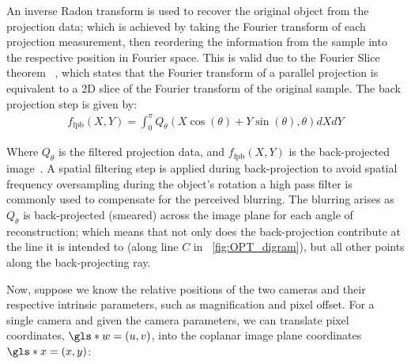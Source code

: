 \documentclass{osa-article}
\begin{document}

An inverse Radon transform is used to recover the original object from the projection data; which is achieved by taking the Fourier transform of each projection measurement, then reordering the information from the sample into the respective position in Fourier space.
This is valid due to the Fourier Slice theorem~\cite{bracewellStripIntegrationRadio1956}
, which states that the Fourier transform of a parallel projection is equivalent to a 2D slice of the Fourier transform of the original sample.
The back projection step is given by:
\begin{align}
  f_{\text{fpb}}(X,Y) = \int_{0}^{\pi} Q_\theta (X\cos(\theta)+Y\sin(\theta),\theta)dXdY
\end{align}

Where \(Q_\theta \) is the filtered projection data, and \(f_{\text{fpb}}(X,Y)\) is the back-projected image~\cite{dudgeonMultidimensionalDigitalSignal1984}.
A spatial filtering step is applied during back-projection  to avoid spatial frequency oversampling during the object’s rotation
a high pass filter is commonly used to compensate for the perceived blurring.
The blurring arises as \(Q_\theta \) is back-projected (smeared) across the image plane for each angle of reconstruction; which means that not only does the back-projection contribute at the line it is intended to (along line \(C\) in \figurename~\ref{fig:OPT_digram}), but all other points along the back-projecting ray.


Now, suppose we know the relative positions of the two cameras and their respective intrinsic parameters, such as magnification and pixel offset.
For a single camera and given the camera parameters, we can translate pixel coordinates, \(\gls*{w} = (u, v)\), into the coplanar image plane coordinates \(\gls*{x}=(x, y)\):
\end{document}
